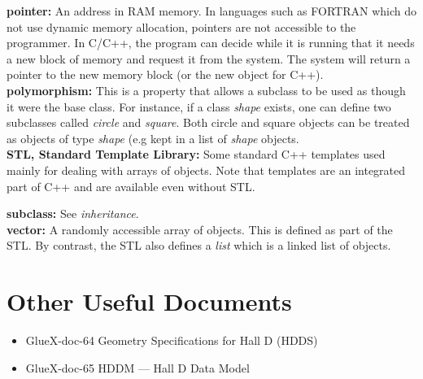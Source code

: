\documentclass[12pt]{article}
\begin{document}
{\bf pointer:} An address in RAM memory. In languages such as FORTRAN
which do not use dynamic memory allocation, pointers are not accessible
to the programmer. In C/C++, the program can decide while it is running
that it needs a new block of memory and request it from the system.
The system will return a pointer to the new memory block (or the new
object for C++).\\

{\bf polymorphism:} This is a property that allows a subclass to be
used as though it were the base class. For instance, if a class
{\it shape} exists, one can define two subclasses called {\it circle}
and {\it square}. Both circle and square objects can be treated as
objects of type {\it shape} (e.g kept in a list of {\it shape} objects.\\

{\bf STL, Standard Template Library:} Some standard C++ templates used
mainly for dealing with arrays of objects. Note that templates are 
an integrated part of C++ and are available even without STL.

{\bf subclass:} See {\it inheritance}.\\

{\bf vector:} A randomly accessible array of objects. This is defined
as part of the STL. By contrast, the STL also defines a {\it list}
which is a linked list of objects.\\

\section{Other Useful Documents}
\label{documents}

\begin{itemize}
\item{GlueX-doc-64} Geometry Specifications for Hall D (HDDS)
\item{GlueX-doc-65} HDDM --- Hall D Data Model
\end{itemize}
\end{document}
